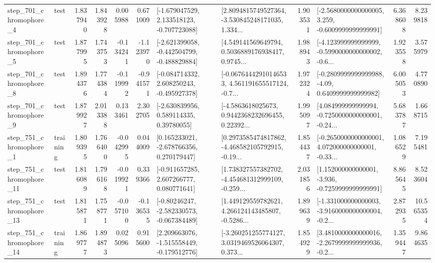 \begin{tabular}{llrrrrllrlrr}
   step\_701\_chromophore\_4 &      test &      1.837940 &    1.843928 &      0.005988 &  0.671009 &   [-1.679047529, 2.133518123, -0.707723088] &  [2.8094815749527364, -3.530845248171035, 1.334... &       1.903531 &  [-2.5680000000000005, 3.259, -0.6009999999999991] &            6.368608 &          8.239818 \\
   step\_701\_chromophore\_5 &      test &      1.877995 &    1.743753 &     -0.134241 & -1.123970 &  [-2.621399058, -0.442504799, -0.488829884] &  [4.549141569649794, 0.5036889176938417, 0.9745... &       1.988943 &  [-4.123999999999999, -0.5990000000000002, -0.6... &            1.923558 &          3.575979 \\
   step\_701\_chromophore\_8 &      test &      1.894376 &    1.774384 &     -0.119992 & -0.941571 &   [-0.084714332, 2.608250243, -0.495927378] &  [-0.06764442910146533, 4.561191655517124, -0.7... &       1.972324 &   [-0.2809999999999988, -4.09, 0.6409999999999982] &            6.005053 &          4.770890 \\
   step\_701\_chromophore\_9 &      test &      1.879927 &    2.013388 &      0.133461 &  2.302705 &     [-2.630839956, 0.589114335, 0.39780055] &  [-4.5863618025673, 0.9442368232696455, 0.22392... &       1.995097 &  [4.084999999999994, -0.7250000000000001, -0.24... &            5.683787 &          1.668715 \\
   step\_751\_chromophore\_1 &  training &      1.809395 &    1.766400 &     -0.042995 &  0.044009 &    [0.165233021, -2.678766356, 0.270179447] &  [0.2973585474817862, -4.468582105792915, -0.19... &       1.854437 &  [-0.2650000000000001, 4.072000000000001, -0.33... &            1.086529 &          7.195481 \\
  step\_751\_chromophore\_11 &      test &      1.816089 &    1.796168 &     -0.019921 &  0.339366 &    [-0.911657285, 2.607266777, 0.080771641] &  [1.738327557382702, -4.454681312999109, -0.259... &       2.031856 &   [1.152000000000001, -3.936, -0.7259999999999991] &            8.865645 &          8.523604 \\
  step\_751\_chromophore\_13 &      test &      1.815871 &    1.758771 &     -0.057100 & -0.136535 &   [-0.80246247, -2.582330573, -0.067384489] &  [1.449129559782621, 4.266124143485807, -0.5286... &       1.899639 &  [-1.331000000000003, -3.9160000000000004, -0.2... &            2.872935 &         10.565354 \\
  step\_751\_chromophore\_14 &  training &      1.869777 &    1.894873 &      0.025096 &  0.915600 &   [2.209663076, -1.515558449, -0.179512776] &  [-3.260251255774127, 3.0319469526064307, 0.373... &       1.854929 &  [3.4810000000000016, -2.2679999999999936, -0.2... &            1.359447 &          9.864635 \\

\end{tabular}
